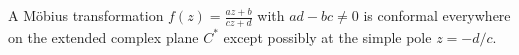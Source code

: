 A Möbius transformation $f(z) = \frac{az+b}{cz+d}$ with $ad-bc \neq 0$ is conformal everywhere on the extended complex plane $C^*$ except possibly at the simple pole $z = -d/c$.
